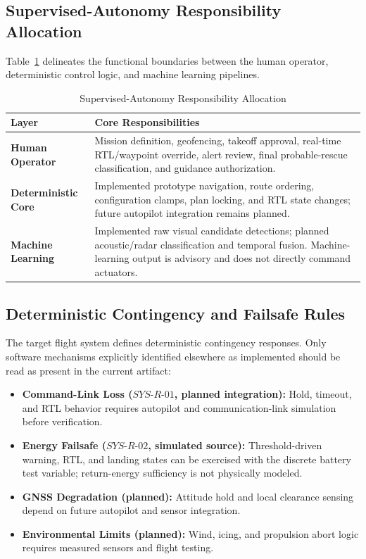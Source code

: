 \subsection{Supervised-Autonomy Responsibility Allocation}
Table~\ref{tab:responsibility_allocation} delineates the functional boundaries between the human operator, deterministic control logic, and machine learning pipelines.

\begin{table}[t]
\caption{Supervised-Autonomy Responsibility Allocation}
\label{tab:responsibility_allocation}
\centering
\footnotesize
\begin{tabularx}{\columnwidth}{@{}lX@{}}
\toprule
\textbf{Layer} & \textbf{Core Responsibilities} \\
\midrule
\textbf{Human Operator} & Mission definition, geofencing, takeoff approval, real-time RTL/waypoint override, alert review, final probable-rescue classification, and guidance authorization. \\
\midrule
\textbf{Deterministic Core} & Implemented prototype navigation, route ordering, configuration clamps, plan locking, and RTL state changes; future autopilot integration remains planned. \\
\midrule
\textbf{Machine Learning} & Implemented raw visual candidate detections; planned acoustic/radar classification and temporal fusion. Machine-learning output is advisory and does not directly command actuators. \\
\bottomrule
\end{tabularx}
\end{table}

\subsection{Deterministic Contingency and Failsafe Rules}
The target flight system defines deterministic contingency responses. Only software mechanisms explicitly identified elsewhere as implemented should be read as present in the current artifact:
\begin{itemize}
    \item \textbf{Command-Link Loss ($SYS\text{-}R\text{-}01$, planned integration):} Hold, timeout, and RTL behavior requires autopilot and communication-link simulation before verification.
    \item \textbf{Energy Failsafe ($SYS\text{-}R\text{-}02$, simulated source):} Threshold-driven warning, RTL, and landing states can be exercised with the discrete battery test variable; return-energy sufficiency is not physically modeled.
    \item \textbf{GNSS Degradation (planned):} Attitude hold and local clearance sensing depend on future autopilot and sensor integration.
    \item \textbf{Environmental Limits (planned):} Wind, icing, and propulsion abort logic requires measured sensors and flight testing.
\end{itemize}
